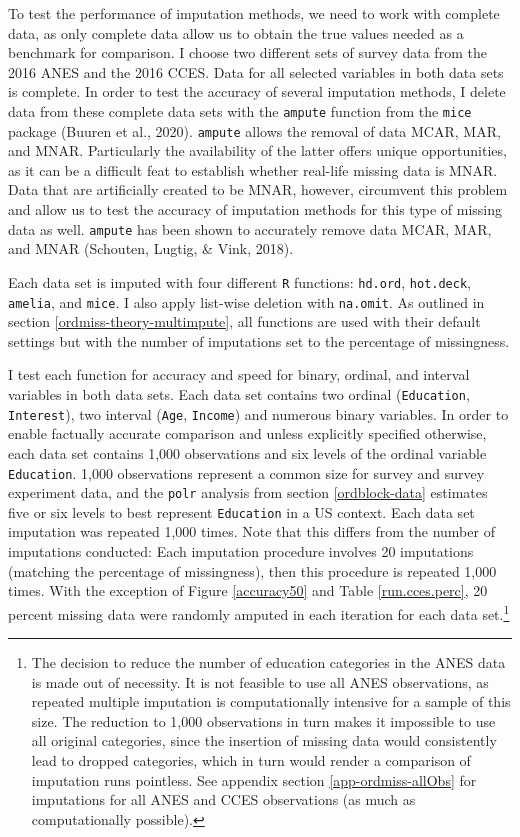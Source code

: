 \documentclass[12pt,econ]{sources/authesis}
\begin{document}
To test the performance of imputation methods, we need to work with complete data, as only complete data allow us to obtain the true values needed as a benchmark for comparison. I choose two different sets of survey data from the 2016 ANES and the 2016 CCES. Data for all selected variables in both data sets is complete. In order to test the accuracy of several imputation methods, I delete data from these complete data sets with the \texttt{ampute} function from the \texttt{mice} package (Buuren et al., 2020). \texttt{ampute} allows the removal of data MCAR, MAR, and MNAR. Particularly the availability of the latter offers unique opportunities, as it can be a difficult feat to establish whether real-life missing data is MNAR. Data that are artificially created to be MNAR, however, circumvent this problem and allow us to test the accuracy of imputation methods for this type of missing data as well. \texttt{ampute} has been shown to accurately remove data MCAR, MAR, and MNAR (Schouten, Lugtig, \& Vink, 2018).

Each data set is imputed with four different \texttt{R} functions: \texttt{hd.ord}, \texttt{hot.deck}, \texttt{amelia}, and \texttt{mice}. I also apply list-wise deletion with \texttt{na.omit}. As outlined in section \ref{ordmiss-theory-multimpute}, all functions are used with their default settings but with the number of imputations set to the percentage of missingness.

I test each function for accuracy and speed for binary, ordinal, and interval variables in both data sets. Each data set contains two ordinal (\texttt{Education}, \texttt{Interest}), two interval (\texttt{Age}, \texttt{Income}) and numerous binary variables. In order to enable factually accurate comparison and unless explicitly specified otherwise, each data set contains 1,000 observations and six levels of the ordinal variable \texttt{Education}. 1,000 observations represent a common size for survey and survey experiment data, and the \texttt{polr} analysis from section \ref{ordblock-data} estimates five or six levels to best represent \texttt{Education} in a US context. Each data set imputation was repeated 1,000 times. Note that this differs from the number of imputations conducted: Each imputation procedure involves 20 imputations (matching the percentage of missingness), then this procedure is repeated 1,000 times. With the exception of Figure \ref{accuracy50} and Table \ref{run.cces.perc}, 20 percent missing data were randomly amputed in each iteration for each data set.\footnote{The decision to reduce the number of education categories in the ANES data is made out of necessity. It is not feasible to use all ANES observations, as repeated multiple imputation is computationally intensive for a sample of this size. The reduction to 1,000 observations in turn makes it impossible to use all original categories, since the insertion of missing data would consistently lead to dropped categories, which in turn would render a comparison of imputation runs pointless. See appendix section \ref{app-ordmiss-allObs} for imputations for all ANES and CCES observations (as much as computationally possible).}
\end{document}
